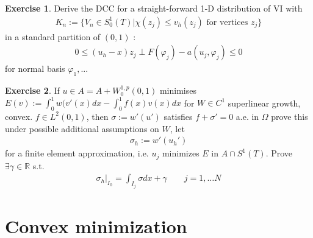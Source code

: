 \documentclass[a4paper,12pt,oneside,fleqn]{book}
\theoremstyle{definition}
\newtheorem{exercise}{Exercise}[chapter]
\theoremstyle{remark}
\begin{document}
\begin{exercise}
	Derive the DCC for a straight-forward 1-D distribution of VI with
	\begin{align*}
		K_n:= \{ V_n \in S_0^1(T)| \chi(z_j) \le v_h(z_j) \text{ for vertices $z_j$}\}
	\end{align*}
	in a standard partition of $(0, 1)$ :
	\begin{align*}
		0 \le (u_h - x)z_j \perp F(\varphi_j) - a(u_j, \varphi_j) \le 0
	\end{align*}
	for normal basis $\varphi_1,...$
\end{exercise}

\begin{exercise}
	If $u \in A = A + W_0^{1, p} (0, 1)$ minimises $E(v):= \int_0^1 w(v'(x) dx - \int_0^1 f(x) v(x) dx $ for $W \in C^1$ superlinear growth, convex. $ f \in L^2(0, 1)$, then $\sigma := w'(u')$ satisfies $f + \sigma' = 0$ a.e. in $\Omega$ prove this under possible additional assumptions on $W$, let 
	\begin{align*}
		\sigma_h:= w'(u_h')
	\end{align*}
	for a finite element approximation, i.e. $u_j$ minimizes $E$ in $A \cap S^1(T)$. Prove $\exists \gamma \in \mathbb{R}$ s.t.
	\begin{align*}
		\sigma_h|_{I_0} = \int_{I_j} \sigma dx + \gamma \qquad j = 1, \dots N
	\end{align*}
\end{exercise}



\section{Convex minimization}
\end{document}
